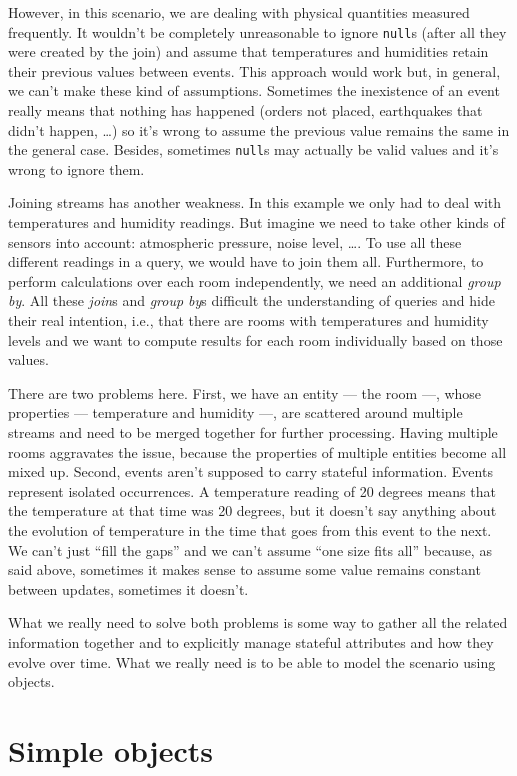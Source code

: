 \documentclass{report}
\begin{document}
However, in this scenario, we are dealing with physical quantities
measured frequently. It wouldn't be completely unreasonable to ignore
\verb=null=s (after all they were created by the join) and assume that
temperatures and humidities retain their previous values between
events. This approach would work but, in general, we can't make these
kind of assumptions. Sometimes the inexistence of an event really
means that nothing has happened (orders not placed, earthquakes that
didn't happen, \ldots) so it's wrong to assume the previous value
remains the same in the general case. Besides, sometimes \verb=null=s
may actually be valid values and it's wrong to ignore them.

Joining streams has another weakness. In this example we only had to
deal with temperatures and humidity readings. But imagine we need to
take other kinds of sensors into account: atmospheric pressure, noise
level, \ldots. To use all these different readings in a query, we
would have to join them all. Furthermore, to perform calculations over
each room independently, we need an additional \emph{group by}. All
these \emph{join}s and \emph{group by}s difficult the understanding of
queries and hide their real intention, i.e., that there are rooms with
temperatures and humidity levels and we want to compute results for
each room individually based on those values.

There are two problems here. First, we have an entity --- the room
---, whose properties --- temperature and humidity ---, are scattered
around multiple streams and need to be merged together for further
processing. Having multiple rooms aggravates the issue, because the
properties of multiple entities become all mixed up. Second, events
aren't supposed to carry stateful information. Events represent
isolated occurrences. A temperature reading of 20 degrees means that
the temperature at that time was 20 degrees, but it doesn't say
anything about the evolution of temperature in the time that goes from
this event to the next. We can't just ``fill the gaps'' and we can't
assume ``one size fits all'' because, as said above, sometimes it
makes sense to assume some value remains constant between updates,
sometimes it doesn't.

What we really need to solve both problems is some way to gather all
the related information together and to explicitly manage stateful
attributes and how they evolve over time. What we really need is to be
able to model the scenario using objects.

\section{Simple objects}
\label{sec:simple-objects}
\end{document}
